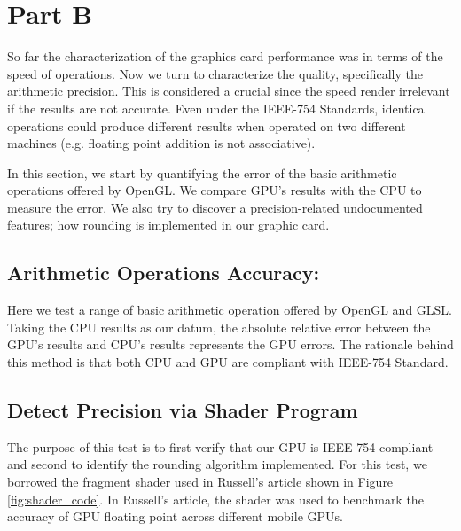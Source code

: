 \section{Part B}
So far the characterization of the graphics card performance was in terms of the speed of operations. Now we turn to characterize the quality, specifically the arithmetic precision. This is considered a crucial since the speed render irrelevant if the results are not accurate. Even under the IEEE-754 Standards, identical operations could produce different results when operated on two different machines (e.g. floating point addition is not associative). 

In this section, we start by quantifying the error of the basic arithmetic operations offered by OpenGL. We compare GPU's results with the CPU to measure the error. We also try to discover a precision-related undocumented features; how rounding is implemented in our graphic card. 

\subsection{Arithmetic Operations Accuracy:}
Here we test a range of basic arithmetic operation offered by OpenGL and GLSL. Taking the CPU results as our datum, the absolute relative error between the GPU's results and CPU's results represents the GPU errors. The rationale behind this method is that both CPU and GPU are compliant with IEEE-754 Standard. %


\subsection{Detect Precision via Shader Program}
The purpose of this test is to first verify that our GPU is IEEE-754 compliant and second to identify the rounding algorithm implemented. For this test, we borrowed the fragment shader used in Russell's article \cite{stuart2013mobile} shown in Figure \ref{fig:shader_code}. In Russell's article, the shader was used to benchmark the accuracy of GPU floating point across different mobile GPUs. 

